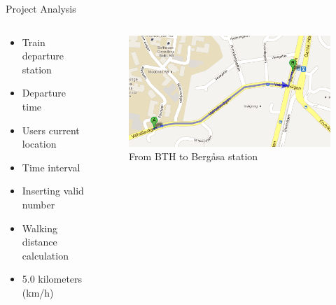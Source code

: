 \documentclass[xcolor=pdftex,dvipsnames,table]{beamer}
\begin{document}
\begin{frame}{Project Analysis}
    \begin{columns}[t] %
      \begin{column}[T]{5cm} %
        \begin{itemize}
            \item<+-| alert@+> Train departure station
            \item<+-| alert@+> Departure time
            \item<+-| alert@+> Users current location
            \item<+-| alert@+> Time interval
            \item<+-| alert@+> Inserting valid number
            \item<+-| alert@+> Walking distance calculation
            \item<+-| alert@+> 5.0 kilometers (km/h) %
          \end{itemize}  
      \end{column}
    \begin{column}[T]{5cm} %
      \begin{figure}
        \centerline{\includegraphics[scale=0.33]{path}}
        \vspace*{10pt}
        \captionsetup{justification=centering} %
        \caption{From BTH to Bergåsa station}
      \end{figure}
    \end{column}
  \end{columns}
\end{frame}
\end{document}
